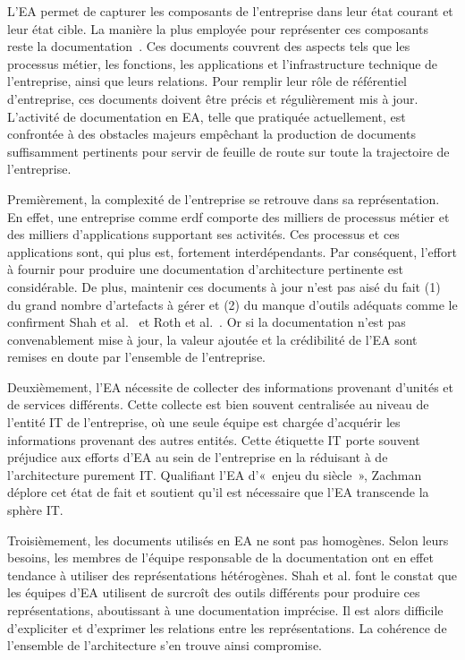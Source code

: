 L'EA permet de capturer les composants de l'entreprise dans leur état courant
et leur état cible. La manière la plus employée pour représenter ces composants
reste la documentation~\cite{barn2013enterprise}. Ces documents couvrent des
aspects tels que les processus métier, les fonctions, les applications et
l'infrastructure technique de l'entreprise, ainsi que leurs relations. Pour
remplir leur rôle de référentiel d'entreprise, ces documents doivent être
précis et régulièrement mis à jour. L'activité de documentation en EA, telle
que pratiquée actuellement, est confrontée à des obstacles majeurs empêchant la
production de documents suffisamment pertinents pour servir de feuille de route
sur toute la trajectoire de l'entreprise.

Premièrement, la complexité de l'entreprise se retrouve dans sa représentation.
En effet, une entreprise comme \gls{erdf} comporte des milliers de processus
métier et des milliers d'applications supportant ses activités.  Ces processus
et ces applications sont, qui plus est, fortement interdépendants. Par
conséquent, l'effort à fournir pour produire une documentation d'architecture
pertinente est considérable. De plus, maintenir ces documents à jour n'est pas
aisé du fait (1) du grand nombre d'artefacts à gérer et (2) du manque d'outils
adéquats comme le confirment Shah et al.~\cite{shah2007frameworks} et Roth et
al.~\cite{roth2013enterprise}. Or si la documentation n'est pas convenablement
mise à jour, la valeur ajoutée et la crédibilité de l'EA sont remises en doute
par l'ensemble de l'entreprise.

Deuxièmement, l'EA nécessite de collecter des informations provenant d'unités
et de services différents. Cette collecte est bien souvent centralisée au
niveau de l'entité IT de l'entreprise, où une seule équipe est chargée
d'acquérir les informations provenant des autres entités. Cette étiquette IT
porte souvent préjudice aux efforts d'EA au sein de l'entreprise en la
réduisant à de l'architecture purement IT. Qualifiant l'EA d'«~enjeu du
siècle~», Zachman déplore cet état de fait et soutient qu'il est nécessaire que
l'EA transcende la sphère IT.

Troisièmement, les documents utilisés en EA ne sont pas homogènes. Selon leurs
besoins, les membres de l'équipe responsable de la documentation ont en effet
tendance à utiliser des représentations hétérogènes. Shah et al.
\cite{shah2007frameworks} font le constat que les équipes d'EA utilisent de
surcroît des outils différents pour produire ces représentations, aboutissant à
une documentation imprécise. Il est alors difficile d'expliciter et d'exprimer
les relations entre les représentations. La cohérence de l'ensemble de
l'architecture s'en trouve ainsi compromise.

